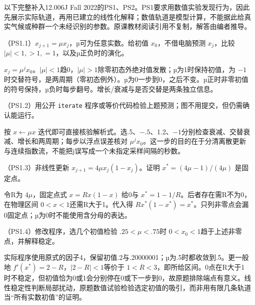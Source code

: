以下完整补入12.006J Fall 2022的PS1、PS2。PS1要求用数值实验发现行为，因此先展示实际轨道，再用已建立的线性化解释；数值轨道是模型计算，不能据此给真实气候或种群一个未经识别的参数。原课教材阅读引用不复制，解答由编者推导。

\begin{exercise}\label{task:chaos-PS1-1}
（PS1.1）$x_{j+1}=\mu x_j$，µ可为任意实数。给初值 $x_0$，不借电脑预测 $x_j$，比较 $|\mu|<1,>1,=1$，以及µ正负时的演化。
\end{exercise}
\begin{solution}
$x_j=\mu^jx_0$。$|\mu|<1$趋0，$|\mu|>1$除零初态外绝对值发散；µ为1时保持初值，为 $-1$ 时交替符号，是两周期（零初态例外）。µ为0一步到0，之后不变。µ正时非零初值的符号保持，µ负时每步翻号。增长/衰减与是否交替是两条独立信息。
\end{solution}
\begin{exercise}\label{task:chaos-PS1-2}
（PS1.2）用公开 \texttt{iterate} 程序或等价代码检验上题预测；图不用提交，但仍需确认能运行。
\end{exercise}
\begin{solution}
按 $x\leftarrow\mu x$ 迭代即可直接核验解析式。选.5、$-.5$、1.2、$-1$分别检查衰减、交替衰减、增长和两周期；每步以浮点误差核对 $\mu^jx_0$。这一步的目的在于分清离散更新与连续指数流，不能把j误写成一个未指定采样间隔的秒数。
\end{solution}
\begin{exercise}\label{task:chaos-PS1-3}
（PS1.3）非线性更新 $x_{j+1}=4\mu x_j(1-x_j)$。证明 $x^*=(4\mu-1)/(4\mu)$ 是固定点。
\end{exercise}
\begin{solution}
令R为 $4\mu$，固定点式 $x=Rx(1-x)$ 给0与 $x^*=1-1/R$。后者存在需R不为0，在物理区间 $0<x<1$还需R大于1。代入得 $Rx^*(1-x^*)=x^*$。只列非零点会漏0固定点；µ为0时不能使用含分母的表达。
\end{solution}
\begin{exercise}\label{task:chaos-PS1-4}
（PS1.4）修改程序，选几个初值检验 $.25<\mu<.75$时 $0<x_0<1$趋于上述非零点，并解释稳定。
\end{exercise}
\begin{solution}
实际程序使用原式的因子4，保留初值.2与.20000001；µ为.5时都收敛到.5。更一般地 $f'(x^*)=2-R$，$|2-R|<1$等价于 $1<R<3$，即所给区间。0点在R大于1时不稳定，但初值恰为0或1会分别停在0或下一步到0，故原题排除端点有意义。线性稳定性判断局部扰动，原题数值试验检验选定初值的吸引，而非用有限几条轨道当“所有实数初值”的证明。
\end{solution}
